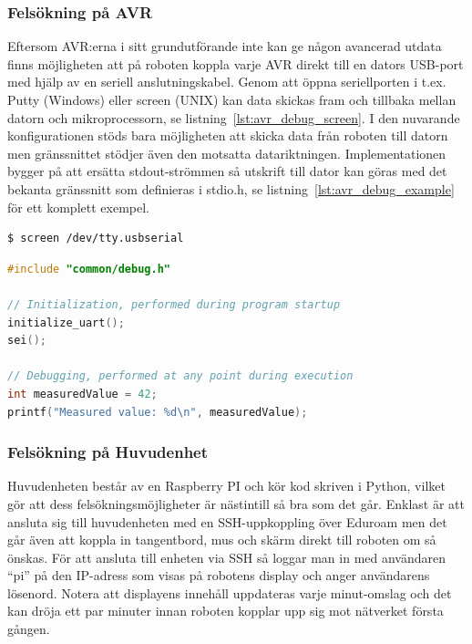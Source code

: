 \documentclass{article}
\begin{document}
\subsubsection{Felsökning på AVR}
Eftersom AVR:erna i sitt grundutförande inte kan ge någon avancerad utdata finns möjligheten att på roboten koppla varje AVR direkt till en dators USB-port med hjälp av en seriell anslutningskabel. Genom att öppna seriellporten i t.ex. Putty (Windows) eller screen (UNIX) kan data skickas fram och tillbaka mellan datorn och mikroprocessorn, se listning~\ref{lst:avr_debug_screen}. I den nuvarande konfigurationen stöds bara möjligheten att skicka data från roboten till datorn men gränssnittet stödjer även den motsatta datariktningen. Implementationen bygger på att ersätta stdout-strömmen så utskrift till dator kan göras med det bekanta gränssnitt som definieras i stdio.h, se listning~\ref{lst:avr_debug_example} för ett komplett exempel.
\newline
\begin{lstlisting}[language=sh, label={lst:avr_debug_screen}, caption={Anslutning via screen}]
$ screen /dev/tty.usbserial
\end{lstlisting}

\begin{lstlisting}[language=C, label={lst:avr_debug_example}, caption=Exempel av utskrift]
#include "common/debug.h"

// Initialization, performed during program startup
initialize_uart();
sei();

// Debugging, performed at any point during execution
int measuredValue = 42;
printf("Measured value: %d\n", measuredValue);
\end{lstlisting}

\subsubsection{Felsökning på Huvudenhet}
Huvudenheten består av en Raspberry PI och kör kod skriven i Python, vilket gör att dess felsökningsmöjligheter är nästintill så bra som det går. Enklast är att ansluta sig till huvudenheten med en SSH-uppkoppling över Eduroam men det går även att koppla in tangentbord, mus och skärm direkt till roboten om så önskas. För att ansluta till enheten via SSH så loggar man in med användaren ``pi'' på den IP-adress som visas på robotens display och anger användarens lösenord. Notera att displayens innehåll uppdateras varje minut-omslag och det kan dröja ett par minuter innan roboten kopplar upp sig mot nätverket första gången.
\end{document}
